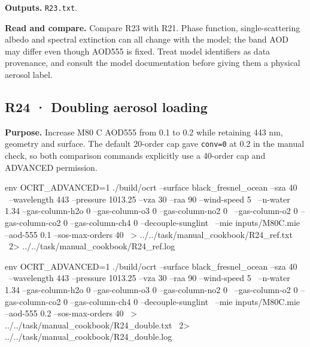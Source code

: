 \textbf{Outputs. }\texttt{R23.txt}.

\textbf{Read and compare. }Compare R23 with R21. Phase function, single-scattering albedo and spectral extinction can all change with the model; the band AOD may differ even though AOD555 is fixed. Treat model identifiers as data provenance, and consult the model documentation before giving them a physical aerosol label.


\subsection{R24 · Doubling aerosol loading}
\label{sec:auto:09_cookbook:5.4}

\label{recipe:R24}

\textbf{Purpose. }Increase M80 C AOD555 from 0.1 to 0.2 while retaining 443 nm, geometry and surface. The default 20-order cap gave \texttt{conv=\allowbreak{}0} at 0.2 in the manual check, so both comparison commands explicitly use a 40-order cap and ADVANCED permission.

\noindent\begin{minipage}{\linewidth}
\begin{ManualCode}

env OCRT_ADVANCED=1 ./build/ocrt --surface black_fresnel_ocean --sza 40 \
  --wavelength 443 --pressure 1013.25 --vza 30 --raa 90 --wind-speed 5 \
  --n-water 1.34 --gas-column-h2o 0 --gas-column-o3 0 --gas-column-no2 0 \
  --gas-column-o2 0 --gas-column-co2 0 --gas-column-ch4 0 --decouple-sunglint \
  --mie inputs/M80C.mie --aod-555 0.1 --sos-max-orders 40 \
  > ../../task/manual_cookbook/R24_ref.txt \
  2> ../../task/manual_cookbook/R24_ref.log

\end{ManualCode}
\end{minipage}\par

\noindent\begin{minipage}{\linewidth}
\begin{ManualCode}

env OCRT_ADVANCED=1 ./build/ocrt --surface black_fresnel_ocean --sza 40 \
  --wavelength 443 --pressure 1013.25 --vza 30 --raa 90 --wind-speed 5 \
  --n-water 1.34 --gas-column-h2o 0 --gas-column-o3 0 --gas-column-no2 0 \
  --gas-column-o2 0 --gas-column-co2 0 --gas-column-ch4 0 --decouple-sunglint \
  --mie inputs/M80C.mie --aod-555 0.2 --sos-max-orders 40 \
  > ../../task/manual_cookbook/R24_double.txt \
  2> ../../task/manual_cookbook/R24_double.log

\end{ManualCode}
\end{minipage}\par

